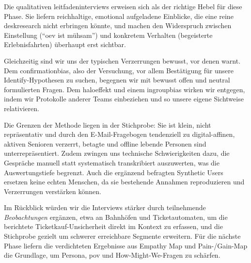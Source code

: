 Die qualitativen \gls{leitfadeninterview}s erweisen sich als der richtige Hebel für diese Phase. Sie liefern reichhaltige, emotional aufgeladene Einblicke, die eine reine \gls{deskresearch} nicht erbringen könnte, und machen den Widerspruch zwischen Einstellung (``\gls{oev} ist mühsam'') und konkretem Verhalten (begeisterte Erlebnisfahrten) überhaupt erst sichtbar.

Gleichzeitig sind wir uns der typischen Verzerrungen bewusst, vor denen \textcite{blume2025} warnt. Dem \gls{confirmationbias}, also der Versuchung, vor allem Bestätigung für unsere Identify-Hypothesen zu suchen, begegnen wir mit bewusst offen und neutral formulierten Fragen. Dem \gls{haloeffekt} und einem \gls{ingroupbias} wirken wir entgegen, indem wir Protokolle anderer Teams einbeziehen und so unsere eigene Sichtweise relativieren.

Die Grenzen der Methode liegen in der Stichprobe: Sie ist klein, nicht repräsentativ und durch den E-Mail-Fragebogen tendenziell zu digital-affinen, aktiven Senioren verzerrt, betagte und offline lebende Personen sind unterrepräsentiert. Zudem zwingen uns technische Schwierigkeiten dazu, die Gespräche manuell statt systematisch transkribiert auszuwerten, was die Auswertungstiefe begrenzt. Auch die ergänzend befragten Synthetic Users ersetzen keine echten Menschen, da sie bestehende Annahmen reproduzieren und Verzerrungen verstärken können.

Im Rückblick würden wir die Interviews stärker durch teilnehmende \emph{Beobachtungen} ergänzen, etwa an Bahnhöfen und Ticketautomaten, um die berichtete Ticketkauf-Unsicherheit direkt im Kontext zu erfassen, und die Stichprobe gezielt um schwerer erreichbare Segmente erweitern. Für die nächste Phase liefern die verdichteten Ergebnisse aus Empathy Map und Pain-/Gain-Map die Grundlage, um Persona, \gls{pov} und How-Might-We-Fragen zu schärfen.


